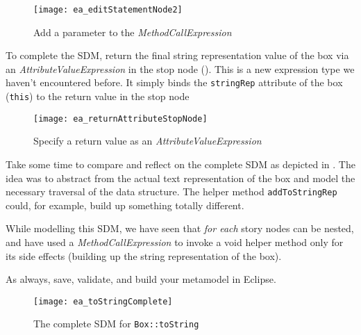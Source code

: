 \begin{stepbystep}
\begin{figure}[htbp]
\begin{center}
  \texttt{[image: ea\_editStatementNode2]}
  \caption{Add a parameter to the \emph{MethodCallExpression}}
  \label{ea:editStatement2}
\end{center}
\end{figure}

\item To complete the SDM, return the final string representation value of the box via an \emph{AttributeValueExpression} in
the stop node (). This is a new expression type we haven't encountered before. It simply
binds the \texttt{stringRep} attribute of the box (\texttt{this}) to the return value in the stop node


\begin{figure}[htbp]
\begin{center}
  \texttt{[image: ea\_returnAttributeStopNode]}
  \caption{Specify a return value as an \emph{AttributeValueExpression}}
  \label{ea:toStringStopNode}
\end{center}
\end{figure}

\vspace{0.5cm}

\item Take some time to compare and reflect on the complete SDM as depicted in .  The idea was to
abstract from the actual text representation of the box and model the necessary traversal of the data structure. The helper method \texttt{addToStringRep}
could, for example, build up something totally different.

\vspace{0.5cm}

\item While modelling this SDM, we have seen that \emph{for each} story nodes can be nested, and have used a \emph{MethodCallExpression}
to invoke a void helper method only for its side effects (building up the string representation of the box).

\vspace{0.5cm}

\item As always, save, validate, and build your metamodel in Eclipse.

\begin{figure}[htbp]
\begin{center}
  \texttt{[image: ea\_toStringComplete]}
  \caption{The complete SDM for \texttt{Box::toString}}  
  \label{ea:sdm_tostringComplete}
\end{center}
\end{figure}
\FloatBarrier

\end{stepbystep}
